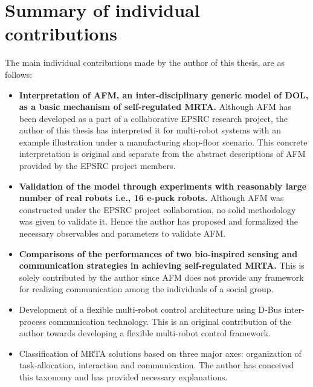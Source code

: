 \section{Summary of individual contributions}
The main individual contributions made by the author of this thesis, are as follows:
\begin{itemize}
\item \textbf{Interpretation of AFM, an inter-disciplinary generic model of DOL, as a basic mechanism of self-regulated MRTA.} Although AFM has been developed as a part of a collaborative EPSRC research project, the author of this thesis has interpreted it for multi-robot systems with an example illustration under a manufacturing shop-floor scenario. This concrete interpretation is original and separate from the  abstract descriptions of AFM provided by the EPSRC project members.
\item \textbf{Validation of the model through experiments with reasonably large number of real robots i.e., 16 e-puck robots.} Although  AFM was constructed under the EPSRC project collaboration, no solid methodology was given to validate it. Hence the author has proposed and formalized the necessary observables and parameters to validate AFM. 
\item \textbf{Comparisons of the performances of two bio-inspired sensing and communication strategies in achieving self-regulated MRTA.} This is solely contributed by the author since AFM does not provide any framework for realizing communication among the individuals of a social group.
\item Development of a flexible multi-robot control architecture using D-Bus inter-process communication technology. This is an original contribution of the author towards developing a flexible multi-robot control framework.
\item Classification of MRTA solutions based on three major axes: organization of task-allocation, interaction and communication. The  author has conceived this taxonomy and has provided necessary explanations. 
\end{itemize}
